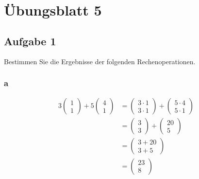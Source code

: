 \chapter{Übungsblatt 5}

\section{Aufgabe 1}
Bestimmen Sie die Ergebnisse der folgenden Rechenoperationen.

\subsection{a}
\begin{align*}
    3\begin{pmatrix} 1 \\ 1 \end{pmatrix} + 5 \begin{pmatrix} 4 \\ 1 \end{pmatrix}
     & = \begin{pmatrix} 3 \cdot 1 \\ 3 \cdot 1 \end{pmatrix} + \begin{pmatrix} 5 \cdot 4 \\ 5 \cdot 1 \end{pmatrix} \\
     & = \begin{pmatrix} 3 \\ 3 \end{pmatrix} + \begin{pmatrix} 20 \\ 5 \end{pmatrix}                                \\
     & = \begin{pmatrix} 3+20 \\ 3+5 \end{pmatrix}                                                                   \\
     & = \begin{pmatrix} 23 \\ 8 \end{pmatrix}
\end{align*}

